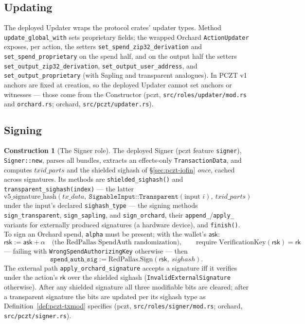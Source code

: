 \documentclass[11pt,a4paper]{article}
\theoremstyle{definition}
\newtheorem{construction}[theorem]{Construction}
\newcommand{\rk}{\mathsf{rk}}
\newcommand{\ask}{\ensuremath{\mathsf{ask}}}
\newcommand{\rsk}{\ensuremath{\mathsf{rsk}}}
\begin{document}
\subsection{Updating}\label{sec:pczt-update}

The deployed Updater wraps the protocol crates' updater types. Method
\texttt{update\_global\_with} sets proprietary fields; the wrapped
Orchard \texttt{ActionUpdater} exposes, per action, the setters
\texttt{set\_spend\_zip32\_derivation} and
\texttt{set\_spend\_proprietary} on the spend half, and on the output
half the setters \texttt{set\_output\_zip32\_derivation},
\texttt{set\_output\_user\_address}, and
\texttt{set\_output\_proprietary} (with Sapling and transparent
analogues). In PCZT v1 anchors are fixed at creation, so the
deployed
Updater cannot set anchors or witnesses --- those come from the
Constructor (\textsf{pczt}, \texttt{src/roles/updater/mod.rs} and
\texttt{orchard.rs}; \textsf{orchard}, \texttt{src/pczt/updater.rs}).

\subsection{Signing}\label{sec:pczt-sign}

\begin{construction}[The Signer role]\label{def:pczt-sign}
The deployed Signer (\textsf{pczt} feature \texttt{signer}),
\texttt{Signer::new}, parses all bundles, extracts an effects-only
\texttt{TransactionData}, and computes $\mathit{txid\_parts}$ and the
shielded sighash of \S\ref{sec:pczt-iofin} \emph{once}, cached across
signatures. Its methods are \texttt{shielded\_sighash()} and
\texttt{transparent\_sighash(index)} --- the latter
\[
\mathrm{v5\_signature\_hash}(\mathit{tx\_data},\
\texttt{SignableInput::Transparent}(\text{input } i),\
\mathit{txid\_parts})
\]
under the input's declared \texttt{sighash\_type} --- the signing
methods \texttt{sign\_transparent}, \texttt{sign\_sapling}, and
\texttt{sign\_orchard}, their \texttt{append\_}/\texttt{apply\_}
variants for externally produced signatures (a hardware device), and
\texttt{finish()}. To sign an Orchard
spend, \texttt{alpha} must be present; with the wallet's $\ask$:
\[
\rsk := \ask + \alpha
\quad\text{(the RedPallas SpendAuth randomization)}, \qquad
\text{require } \mathrm{VerificationKey}(\rsk) = \rk
\]
--- failing with \texttt{WrongSpendAuthorizingKey} otherwise --- then
\[
\texttt{spend\_auth\_sig} := \mathrm{RedPallas.Sign}(\rsk,\
\mathit{sighash}).
\]
The external path \texttt{apply\_orchard\_signature} accepts a signature
iff it verifies under the action's $\rk$ over the shielded sighash
(\texttt{InvalidExternalSignature} otherwise). After any shielded
signature all three modifiable bits are cleared; after a transparent
signature the bits are updated per its sighash type as
Definition~\ref{def:pczt-txmod} specifies (\textsf{pczt},
\texttt{src/roles/signer/mod.rs}; \textsf{orchard},
\texttt{src/pczt/signer.rs}).
\end{construction}
\end{document}
